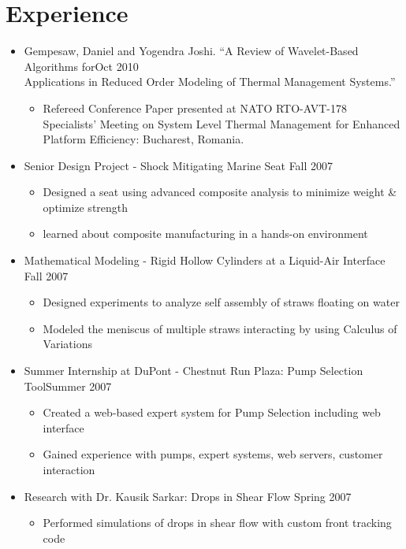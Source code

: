 \documentclass[10pt]{article}
\newenvironment{myitem}{
\begin{itemize}
  \setlength{\itemsep}{1pt}
  \setlength{\parskip}{0pt}
  \setlength{\parsep}{0pt}
}{\end{itemize}}
\begin{document}
\section{Experience}
\vspace{-0.25cm}
\begin{myitem}
\item Gempesaw, Daniel and Yogendra Joshi. ``A Review of Wavelet-Based Algorithms for\hfill Oct 2010\\ 
Applications in Reduced Order Modeling of Thermal Management Systems.''
\begin{myitem}
\item Refereed Conference Paper presented at NATO RTO-AVT-178 Specialists' Meeting on System Level Thermal Management for Enhanced Platform Efficiency: Bucharest, Romania. 
\end{myitem}
%
\item Senior Design Project - Shock Mitigating Marine Seat \hfill Fall 2007
\begin{myitem}
  \item Designed a seat using advanced composite analysis to minimize weight \& optimize strength
  \item learned about composite manufacturing in a hands-on environment
\end{myitem}
%
\item Mathematical Modeling - Rigid Hollow Cylinders at a Liquid-Air Interface \hfill Fall 2007
\begin{myitem}
  \item Designed experiments to analyze self assembly of straws floating on water
  \item Modeled the meniscus of multiple straws interacting by using Calculus of Variations
\end{myitem}
%
\item Summer Internship at DuPont - Chestnut Run Plaza: Pump Selection Tool\hfill Summer 2007
 \begin{myitem}
  \item Created a web-based expert system for Pump Selection including web interface
  \item Gained experience with pumps, expert systems, web servers, customer interaction
 \end{myitem}
%
\item Research with Dr. Kausik Sarkar: Drops in Shear Flow \hfill Spring 2007
 \begin{myitem}
  \item Performed simulations of drops in shear flow with custom front tracking code

\end{myitem}
\end{myitem}
\end{document}
